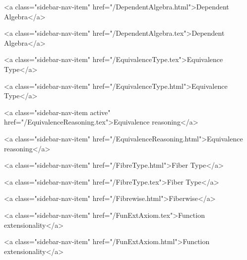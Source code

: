       
    
      
        
          <a class="sidebar-nav-item" href="/DependentAlgebra.html">Dependent Algebra</a>
        
      
    
      
        
          <a class="sidebar-nav-item" href="/DependentAlgebra.tex">Dependent Algebra</a>
        
      
    
      
        
          <a class="sidebar-nav-item" href="/EquivalenceType.tex">Equivalence Type</a>
        
      
    
      
        
          <a class="sidebar-nav-item" href="/EquivalenceType.html">Equivalence Type</a>
        
      
    
      
        
          <a class="sidebar-nav-item active" href="/EquivalenceReasoning.tex">Equivalence reasoning</a>
        
      
    
      
        
          <a class="sidebar-nav-item" href="/EquivalenceReasoning.html">Equivalence reasoning</a>
        
      
    
      
        
          <a class="sidebar-nav-item" href="/FibreType.html">Fiber Type</a>
        
      
    
      
        
          <a class="sidebar-nav-item" href="/FibreType.tex">Fiber Type</a>
        
      
    
      
        
          <a class="sidebar-nav-item" href="/Fibrewise.html">Fiberwise</a>
        
      
    
      
        
          <a class="sidebar-nav-item" href="/FunExtAxiom.tex">Function extensionality</a>
        
      
    
      
        
          <a class="sidebar-nav-item" href="/FunExtAxiom.html">Function extensionality</a>
        
